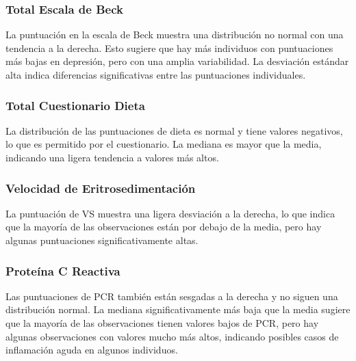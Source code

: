 \documentclass[jou]{apa7}
\begin{document}
	\subsubsection{Total Escala de Beck}
	La puntuación en la escala de Beck muestra una distribución no normal con una tendencia a la derecha. Esto sugiere que hay más individuos con puntuaciones más bajas en depresión, pero con una amplia variabilidad. La desviación estándar alta indica diferencias significativas entre las puntuaciones individuales.
	
	\subsubsection{Total Cuestionario Dieta}
	La distribución de las puntuaciones de dieta es normal y tiene valores negativos, lo que es permitido por el cuestionario. La mediana es mayor que la media, indicando una ligera tendencia a valores más altos.
	
	\subsubsection{Velocidad de Eritrosedimentación}
	La puntuación de VS muestra una ligera desviación a la derecha, lo que indica que la mayoría de las observaciones están por debajo de la media, pero hay algunas puntuaciones significativamente altas.
	
	\subsubsection{Proteína C Reactiva}
	Las puntuaciones de PCR también están sesgadas a la derecha y no siguen una distribución normal. La mediana significativamente más baja que la media sugiere que la mayoría de las observaciones tienen valores bajos de PCR, pero hay algunas observaciones con valores mucho más altos, indicando posibles casos de inflamación aguda en algunos individuos.
	
\end{document}
